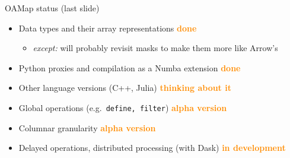 \documentclass[aspectratio=169]{beamer}
\begin{document}
\begin{frame}{OAMap status (last slide)}
\vspace{0.5 cm}
\large
\begin{itemize}\setlength{\itemsep}{0.5 cm}
\item Data types and their array representations \hfill \textcolor{darkorange}{\bf done\hspace{-0.15 cm}}
\begin{itemize}
\item {\it except:} will probably revisit masks to make them more like Arrow's
\end{itemize}

\item Python proxies and compilation as a Numba extension \hfill \textcolor{darkorange}{\bf done}

\item Other language versions (C++, Julia) \hfill \textcolor{darkorange}{\bf thinking about it}

\item Global operations (e.g.\ {\tt\normalsize define, filter}) \hfill \textcolor{darkorange}{\bf alpha version}

\item Columnar granularity \hfill \textcolor{darkorange}{\bf alpha version}

\item Delayed operations, distributed processing (with Dask) \hfill \textcolor{darkorange}{\bf in development}
\end{itemize}
\end{frame}
\end{document}
